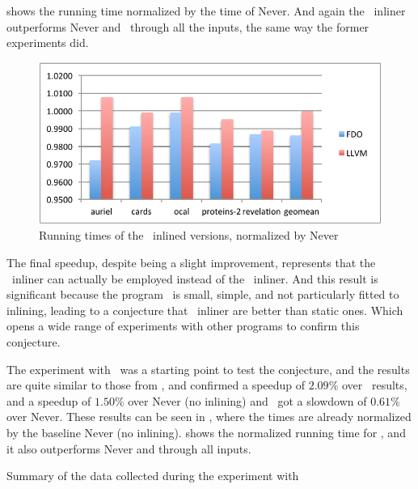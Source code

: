  shows the running time normalized by the time of Never. And again the \FDI\ inliner outperforms Never and \llvm\ through all the inputs, the same way the former experiments did. %

\begin{figure}
  \centering
  \includegraphics[width=1.00\linewidth]{Figures/speedupb}
  \caption{Running times of the \bzip\ inlined versions, normalized by Never}
  \label{fig:speedup}
\end{figure}

The final speedup, despite being a slight improvement, represents that the \FDI\ inliner can actually be employed instead of the \llvm\ inliner. And this result is significant because the program \bzip\ is small, simple, and not particularly fitted to inlining, leading to a conjecture that \FDI\ inliner are better than static ones. Which opens a wide range of experiments with other programs to confirm this conjecture.

The experiment with \gzip\ was a starting point to test the conjecture, and the results are quite similar to those from \bzip, and confirmed a speedup of $2.09 \%$ over \llvm\ results, and a speedup of $1.50 \%$ over Never (no inlining) and \llvm\ got a slowdown of $0.61 \%$ over Never. These results can be seen in , where the times are already normalized by the baseline Never (no inlining).  shows the normalized running time for \gzip, and it also outperforms Never and \llvm through all inputs.

\begin{table}
  \centering
  \begin{tiny}
  
  \end{tiny}
  \caption{Summary of the data collected during the experiment with \gzip}
  \label{tab:speedupz}
\end{table}

